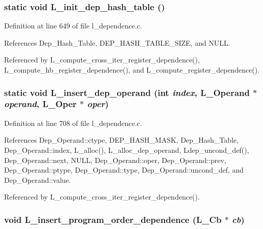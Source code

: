 \subsubsection{\setlength{\rightskip}{0pt plus 5cm}static void L\_\-init\_\-dep\_\-hash\_\-table ()\hspace{0.3cm}{\tt  [static]}}\label{l__dependence_8c_0d12c84bf72375f9068c8204ae3f34ae}




Definition at line 649 of file l\_\-dependence.c.

References Dep\_\-Hash\_\-Table, DEP\_\-HASH\_\-TABLE\_\-SIZE, and NULL.

Referenced by L\_\-compute\_\-cross\_\-iter\_\-register\_\-dependence(), L\_\-compute\_\-hb\_\-register\_\-dependence(), and L\_\-compute\_\-register\_\-dependence().
\subsubsection{\setlength{\rightskip}{0pt plus 5cm}static void L\_\-insert\_\-dep\_\-operand (int {\em index}, L\_\-Operand $\ast$ {\em operand}, L\_\-Oper $\ast$ {\em oper})\hspace{0.3cm}{\tt  [static]}}\label{l__dependence_8c_6cd90e727232f28cc6016f32a2dcbb32}




Definition at line 708 of file l\_\-dependence.c.

References Dep\_\-Operand::ctype, DEP\_\-HASH\_\-MASK, Dep\_\-Hash\_\-Table, Dep\_\-Operand::index, L\_\-alloc(), L\_\-alloc\_\-dep\_\-operand, Ldep\_\-uncond\_\-def(), Dep\_\-Operand::next, NULL, Dep\_\-Operand::oper, Dep\_\-Operand::prev, Dep\_\-Operand::ptype, Dep\_\-Operand::type, Dep\_\-Operand::uncond\_\-def, and Dep\_\-Operand::value.

Referenced by L\_\-compute\_\-cross\_\-iter\_\-register\_\-dependence().
\subsubsection{\setlength{\rightskip}{0pt plus 5cm}void L\_\-insert\_\-program\_\-order\_\-dependence (L\_\-Cb $\ast$ {\em cb})}\label{l__dependence_8c_d1e1fb1c56a781712c05ed6a373e32ef}




